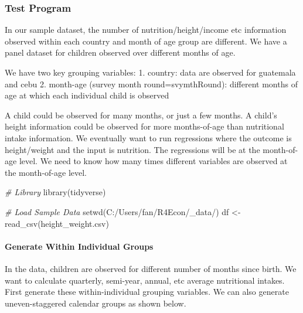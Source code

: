 \documentclass[
]{book}
\newenvironment{Shaded}{\begin{snugshade}}{\end{snugshade}}
\newcommand{\CommentTok}[1]{\textcolor[rgb]{0.56,0.35,0.01}{\textit{#1}}}
\newcommand{\FunctionTok}[1]{\textcolor[rgb]{0.00,0.00,0.00}{#1}}
\newcommand{\NormalTok}[1]{#1}
\newcommand{\OtherTok}[1]{\textcolor[rgb]{0.56,0.35,0.01}{#1}}
\newcommand{\StringTok}[1]{\textcolor[rgb]{0.31,0.60,0.02}{#1}}
\begin{document}
\hypertarget{test-program}{%
\subsubsection{Test Program}\label{test-program}}

In our sample dataset, the number of nutrition/height/income etc information observed within each country and month of age group are different. We have a panel dataset for children observed over different months of age.

We have two key grouping variables:
1. country: data are observed for guatemala and cebu
2. month-age (survey month round=svymthRound): different months of age at which each individual child is observed

A child could be observed for many months, or just a few months. A child's height information could be observed for more months-of-age than nutritional intake information. We eventually want to run regressions where the outcome is height/weight and the input is nutrition. The regressions will be at the month-of-age level. We need to know how many times different variables are observed at the month-of-age level.

\begin{Shaded}
\begin{Highlighting}[]
\CommentTok{\# Library}
\FunctionTok{library}\NormalTok{(tidyverse)}

\CommentTok{\# Load Sample Data}
\FunctionTok{setwd}\NormalTok{(}\StringTok{\textquotesingle{}C:/Users/fan/R4Econ/\_data/\textquotesingle{}}\NormalTok{)}
\NormalTok{df }\OtherTok{\textless{}{-}} \FunctionTok{read\_csv}\NormalTok{(}\StringTok{\textquotesingle{}height\_weight.csv\textquotesingle{}}\NormalTok{)}
\end{Highlighting}
\end{Shaded}

\hypertarget{generate-within-individual-groups}{%
\paragraph{Generate Within Individual Groups}\label{generate-within-individual-groups}}

In the data, children are observed for different number of months since birth. We want to calculate quarterly, semi-year, annual, etc average nutritional intakes. First generate these within-individual grouping variables. We can also generate uneven-staggered calendar groups as shown below.
\end{document}
